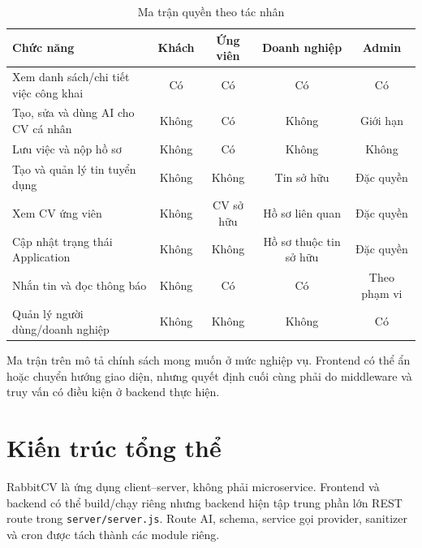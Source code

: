\begin{table}[H]
    \centering
    \scriptsize
    \begin{tabularx}{\textwidth}{|Y|c|c|c|c|} \hline
        \textbf{Chức năng} & \textbf{Khách} & \textbf{Ứng viên} & \textbf{Doanh nghiệp} & \textbf{Admin} \\ \hline
        Xem danh sách/chi tiết việc công khai & Có & Có & Có & Có \\ \hline
        Tạo, sửa và dùng AI cho CV cá nhân & Không & Có & Không & Giới hạn \\ \hline
        Lưu việc và nộp hồ sơ & Không & Có & Không & Không \\ \hline
        Tạo và quản lý tin tuyển dụng & Không & Không & Tin sở hữu & Đặc quyền \\ \hline
        Xem CV ứng viên & Không & CV sở hữu & Hồ sơ liên quan & Đặc quyền \\ \hline
        Cập nhật trạng thái Application & Không & Không & Hồ sơ thuộc tin sở hữu & Đặc quyền \\ \hline
        Nhắn tin và đọc thông báo & Không & Có & Có & Theo phạm vi \\ \hline
        Quản lý người dùng/doanh nghiệp & Không & Không & Không & Có \\ \hline
    \end{tabularx}
    \caption{Ma trận quyền theo tác nhân}
    \label{tab:role-matrix}
\end{table}

Ma trận trên mô tả chính sách mong muốn ở mức nghiệp vụ. Frontend có thể ẩn hoặc chuyển hướng giao diện, nhưng quyết định cuối cùng phải do middleware và truy vấn có điều kiện ở backend thực hiện.

\section{Kiến trúc tổng thể}

RabbitCV là ứng dụng client--server, không phải microservice. Frontend và backend có thể build/chạy riêng nhưng backend hiện tập trung phần lớn REST route trong \texttt{server/server.js}. Route AI, schema, service gọi provider, sanitizer và cron được tách thành các module riêng.

